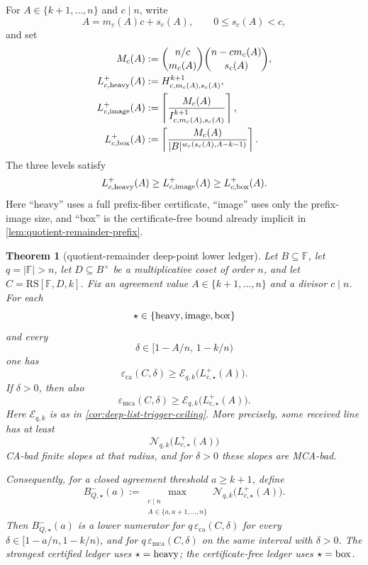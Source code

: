 \documentclass[11pt]{article}
\newtheorem{theorem}{Theorem}[section]
\theoremstyle{definition}
\theoremstyle{remark}
\newcommand{\F}{\mathbb{F}}
\newcommand{\B}{B}
\newcommand{\RS}{\mathrm{RS}}
\newcommand{\eca}{\varepsilon_{\mathrm{ca}}}
\newcommand{\emca}{\varepsilon_{\mathrm{mca}}}
\begin{document}
For $A\in\{k+1,
\ldots,n\}$ and $c\mid n$, write
\[
        A=m_c(A)c+s_c(A),
        \qquad 0\le s_c(A)<c,
\]
and set
\[
\begin{aligned}
        M_c(A)&:=
        \binom{n/c}{m_c(A)}
        \binom{n-cm_c(A)}{s_c(A)},\\
        L_{c,{\rm heavy}}^+(A)&:=
        H_{c,m_c(A),s_c(A)}^{k+1},\\
        L_{c,{\rm image}}^+(A)&:=
        \left\lceil\frac{M_c(A)}{I_{c,m_c(A),s_c(A)}^{k+1}}\right\rceil,\\
        L_{c,{\rm box}}^+(A)&:=
        \left\lceil
        \frac{M_c(A)}{|\B|^{w_c(s_c(A),A-k-1)}}
        \right\rceil .
\end{aligned}
\]
The three levels satisfy
\[
        L_{c,{\rm heavy}}^+(A)
        \ge L_{c,{\rm image}}^+(A)
        \ge L_{c,{\rm box}}^+(A).
\]
Here ``heavy'' uses a full prefix-fiber certificate, ``image'' uses only the
prefix-image size, and ``box'' is the certificate-free bound already implicit in
\cref{lem:quotient-remainder-prefix}.

\begin{theorem}[quotient-remainder deep-point lower ledger]
\label{thm:quotient-remainder-deep-floor}
Let $\B\subseteq\F$, let $q=|\F|>n$, let
$D\subseteq\B^\times$ be a multiplicative coset of order $n$, and let
$C=\RS[\F,D,k]$.  Fix an agreement value $A\in\{k+1,\ldots,n\}$ and a
divisor $c\mid n$.  For each
\[
        \star\in\{{\rm heavy},{\rm image},{\rm box}\}
\]
and every
\[
        \delta\in[1-A/n,\,1-k/n)
\]
one has
\[
        \eca(C,\delta)
        \ge \mathcal E_{q,k}\bigl(L_{c,\star}^+(A)\bigr).
\]
If $\delta>0$, then also
\[
        \emca(C,\delta)
        \ge \mathcal E_{q,k}\bigl(L_{c,\star}^+(A)\bigr).
\]
Here $\mathcal E_{q,k}$ is as in \cref{cor:deep-list-trigger-ceiling}.  More
precisely, some received line has at least
\[
        \mathcal N_{q,k}\bigl(L_{c,\star}^+(A)\bigr)
\]
CA-bad finite slopes at that radius, and for $\delta>0$ these slopes are
MCA-bad.

Consequently, for a closed agreement threshold $a\ge k+1$, define
\[
        B_{Q,\star}^-(a)
        :=\max_{\substack{c\mid n\\ A\in\{a,a+1,\ldots,n\}}}
          \mathcal N_{q,k}\bigl(L_{c,\star}^+(A)\bigr).
\]
Then $B_{Q,\star}^-(a)$ is a lower numerator for $q\,\eca(C,\delta)$ for
every $\delta\in[1-a/n,1-k/n)$, and for $q\,\emca(C,\delta)$ on the
same interval with $\delta>0$.  The strongest
certified ledger uses $\star={\rm heavy}$; the certificate-free ledger uses
$\star={\rm box}$.
\end{theorem}
\end{document}
